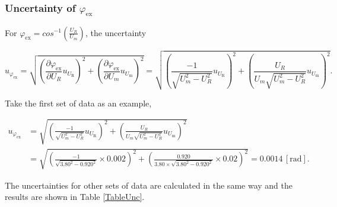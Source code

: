 \documentclass{article}
\begin{document}
\subsubsection*{Uncertainty of $\varphi_\text{ex}$}
For $\varphi_\text{ex}=cos^{-1}(\frac{U_R}{U_m})$, the uncertainty

$$u_{\varphi_\text{ex}} = \sqrt{(\frac{\partial \varphi_\text{ex}}{\partial U_R}u_{U_\text{R}})^2 + (\frac{\partial \varphi_\text{ex}}{\partial U_m}u_{U_\text{m}})^2} = \sqrt{(\frac{-1}{\sqrt{U_m^2-U_R^2}}u_{U_\text{R}})^2 + (\frac{U_R}{U_m\sqrt{U_m^2-U_R^2}}u_{U_\text{m}})^2}.$$

Take the first set of data as an example,

\begin{align*}
    u_{\varphi_\text{ex}} & = \sqrt{(\frac{-1}{\sqrt{U_m^2-U_R^2}}u_{U_\text{R}})^2 + (\frac{U_R}{U_m\sqrt{U_m^2-U_R^2}}u_{U_\text{m}})^2}                                   \\
                          & = \sqrt{(\frac{-1}{\sqrt{3.80^2-0.920^2}}\times 0.002)^2 + (\frac{0.920}{3.80\times\sqrt{3.80^2-0.920^2}}\times 0.02)^2} = 0.0014\,[\text{rad}].
\end{align*}


The uncertainties for other sets of data are calculated in the same way and the results are shown in Table \ref{TableUnc}.
\end{document}
